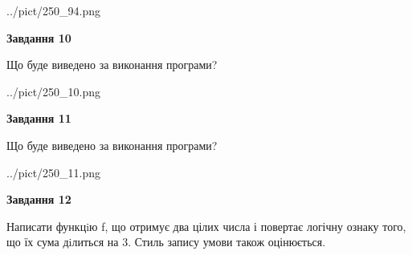 \documentclass[12pt, ukrainian]{article}
\begin{document}
{\begin {large}
\begin{center}
	{../pict/250_94.png}
\end{center}
\newpage

{\begin {center}\textbf{Завдання 10}\end {center}}

Що буде виведено за виконання програми?\par
\begin{center}
	{../pict/250_10.png}
\end{center}
\newpage

{\begin {center}\textbf{Завдання 11}\end {center}}

Що буде виведено за виконання програми?\par
\begin{center}
	{../pict/250_11.png}
\end{center}
\newpage

{\begin {center}\textbf{Завдання 12}\end {center}}


Написати функцiю f, що отримує два цілих числа і повертає логічну ознаку того, що їх сума дiлиться на 3. Стиль запису умови також оцінюється.\par
\newpage

\end {large}}
\end{document}
